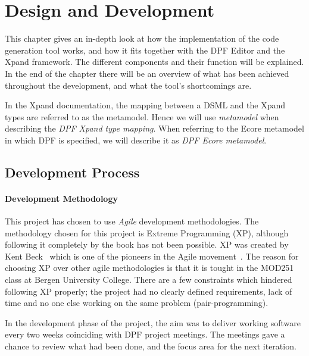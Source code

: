 \chapter{Design and Development}\label{chap:design_and_development}
This chapter gives an in-depth look at how the implementation of the code generation tool works, and how it fits together with the DPF Editor and the Xpand framework. The different components and their function will be explained. In the end of the chapter there will be an overview of what has been achieved throughout the development, and what the tool's shortcomings are.

In the Xpand documentation, the mapping between a DSML and the Xpand types are referred to as the metamodel. Hence we will use \emph{metamodel} when describing the \emph{DPF Xpand type mapping}. When referring to the Ecore metamodel in which DPF is specified, we will describe it as \emph{DPF Ecore metamodel}. 

\section{Development Process}
\subsubsection{Development Methodology}
This project has chosen to use \emph{Agile} development methodologies. The methodology chosen for this project is Extreme Programming (XP), although following it completely by the book has not been possible. XP was created by Kent Beck~\cite{Beck:2004:EPE:1076267} which is one of the pioneers in the Agile movement~\cite{agile_alliance}. The reason for choosing XP over other agile methodologies is that it is tought in the MOD251 class at Bergen University College. There are a few constraints which hindered following XP properly; the project had no clearly defined requirements, lack of time and no one else working on the same problem (pair-programming).

In the development phase of the project, the aim was to deliver working software every two weeks coinciding with DPF project meetings. The meetings gave a chance to review what had been done, and the focus area for the next iteration.
  
